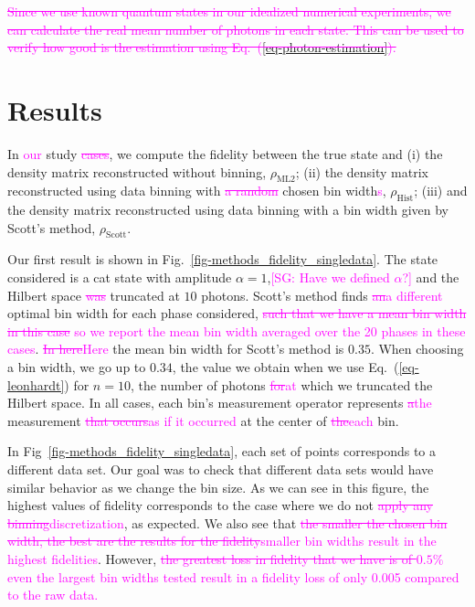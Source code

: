 \documentclass[
reprint,
superscriptaddress,
showpacs,
amsmath,
amssymb,
aps,
pra,
longbibliography
]{revtex4-1}
\providecommand{\aucmnt}[1]{#1}
\providecommand{\editcolor}[2]{\textcolor{#1}{#2}}
\providecommand{\aucmnt}[1]{}
\providecommand{\editcolor}[2]{#2}
\newcommand{\SG}[1]{\editcolor{magenta}{#1}}
\newcommand{\SGs}[1]{\aucmnt{\editcolor{magenta}{\sout{#1}}}}
\newcommand{\SGc}[1]{\aucmnt{\editcolor{magenta}{[SG: #1]}}}
\begin{document}
\SGs{ Since we use known quantum states in our idealized numerical
  experiments, we can calculate the real mean number of photons in
  each state. This can be used to verify how good is the estimation
  using Eq.~(\ref{eq-photon-estimation}).}



\section{Results}
In \SG{our} study \SGs{cases}, we compute the fidelity between the
true state and (i) the density matrix reconstructed without binning,
$\rho_{\mathrm{ML2}}$; (ii) the density matrix reconstructed using
data binning with \SGs{a random} chosen bin width\SG{s},
$\rho_{\mathrm{Hist}}$; (iii) and the density matrix reconstructed
using data binning with a bin width given by Scott's method,
$\rho_{\mathrm{Scott}}$.

Our first result is shown in
Fig.~\ref{fig-methods_fidelity_singledata}. The state considered is a
cat state with amplitude $\alpha = 1$,\SGc{Have we defined $\alpha$?}
and the Hilbert space \SGs{was} truncated at $10$ photons. Scott's
method finds \SGs{an}\SG{a different} optimal bin width for each phase
considered, \SGs{such that we have a mean bin width in this case}
\SG{so we report the mean bin width averaged over the 20 phases in
  these cases}. \SGs{In here}\SG{Here} the mean bin width for Scott's
method is $0.35$. When choosing a bin width, we go up to $0.34$, the
value we obtain when we use Eq.~(\ref{eq-leonhardt}) for $n=10$, the
number of photons \SGs{for}\SG{at} which we truncated the Hilbert
space. In all cases, each bin's measurement operator represents
\SGs{a}\SG{the} measurement \SGs{that occurs}\SG{as if it occurred} at
the center of \SGs{the}\SG{each} bin.
 
In Fig~\ref{fig-methods_fidelity_singledata}, each set of points
corresponds to a different data set. Our goal was to check that
different data sets would have similar behavior as we change the bin
size. As we can see in this figure, the highest values of fidelity
corresponds to the case where we do not \SGs{apply any
  binning}\SG{discretization}, as expected. We also see that \SGs{the
  smaller the chosen bin width, the best are the results for the
  fidelity}\SG{smaller bin widths result in the highest
  fidelities}. However, \SGs{the greatest loss in fidelity that we
  have is of $0.5\%$} \SG{even the largest bin widths tested result in
  a fidelity loss of only 0.005 compared to the raw data.}
\end{document}
